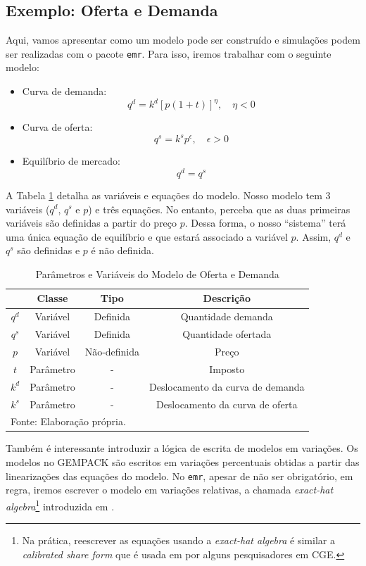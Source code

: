 \documentclass[12pt,twoside]{article}
\providecommand{\tightlist}{%
  \setlength{\itemsep}{0pt}\setlength{\parskip}{0pt}}
\let\rmarkdownfootnote\footnote%
\def\footnote{\protect\rmarkdownfootnote}
\begin{document}
\hypertarget{exemplo-oferta-e-demanda}{%
\subsection{Exemplo: Oferta e Demanda}\label{exemplo-oferta-e-demanda}}

Aqui, vamos apresentar como um modelo pode ser construído e simulações
podem ser realizadas com o pacote \texttt{emr}. Para isso, iremos
trabalhar com o seguinte modelo:

\begin{itemize}
\tightlist
\item
  Curva de demanda: \[q^d = k^d [p (1 + t)]^{\eta}, \quad \eta < 0\]
\item
  Curva de oferta: \[q^s = k^s p^{\epsilon}, \quad \epsilon > 0\]
\item
  Equilíbrio de mercado: \[q^d = q^s\]
\end{itemize}

A Tabela \ref{oferta_demanda} detalha as variáveis e equações do modelo.
Nosso modelo tem 3 variáveis (\(q^d\), \(q^s\) e \(p\)) e três equações.
No entanto, perceba que as duas primeiras variáveis são definidas a
partir do preço \(p\). Dessa forma, o nosso ``sistema'' terá uma única
equação de equilíbrio e que estará associado a variável \(p\). Assim,
\(q^d\) e \(q^s\) são definidas e \(p\) é não definida.

\begin{table}[H]
\caption{Parâmetros e Variáveis do Modelo de Oferta e Demanda}\label{oferta_demanda}
\begin{tabular}{cccc}
\toprule
& Classe   & Tipo     & Descrição          \\
\hline
$q^d$ & Variável & Definida & Quantidade demanda \\
$q^s$ & Variável & Definida & Quantidade ofertada \\
$p$ & Variável & Não-definida & Preço \\
$t$ & Parâmetro & - & Imposto \\
$k^d$ & Parâmetro & - & Deslocamento da curva de demanda \\
$k^s$ & Parâmetro & - & Deslocamento da curva de oferta \\
\bottomrule
\multicolumn{4}{l}{Fonte: Elaboração própria.}\\
\end{tabular}
\end{table}

Também é interessante introduzir a lógica de escrita de modelos em
variações. Os modelos no GEMPACK são escritos em variações percentuais
obtidas a partir das linearizações das equações do modelo. No
\texttt{emr}, apesar de não ser obrigatório, em regra, iremos escrever o
modelo em variações relativas, a chamada \emph{exact-hat
algebra}\footnote{Na prática, reescrever as equações usando a
  \emph{exact-hat algebra} é similar a \emph{calibrated share form} que
  é usada em por alguns pesquisadores em CGE.} introduzida em
\cite{dekle_2008}.
\end{document}
